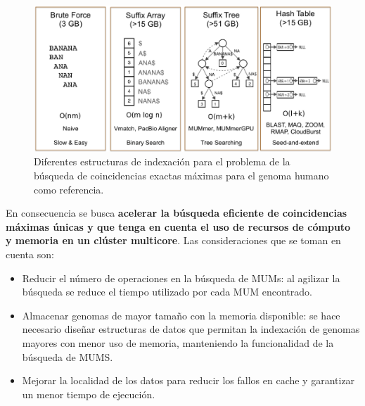 \documentclass[12pt,a4paper]{article}
\begin{document}
\begin{figure}[h] 
   \centering 
   \includegraphics[scale=0.3]{state.eps} 
   \caption{Diferentes estructuras de indexación para el problema de la búsqueda de coincidencias exactas máximas para el genoma humano como referencia.} 
   \label{fig:state} 
 \end{figure}
\indent
En consecuencia se busca \textbf{acelerar la búsqueda eficiente de 
coincidencias máximas únicas y que tenga en cuenta el uso de recursos de cómputo y
memoria en un clúster multicore}. Las consideraciones que se toman en cuenta son:
\begin{itemize}
\item Reducir el número de operaciones en la búsqueda de MUMs: al agilizar la búsqueda se reduce el tiempo utilizado por cada MUM encontrado.
\item Almacenar genomas de mayor tamaño con la memoria disponible: se hace necesario diseñar estructuras de datos que permitan la indexación de genomas mayores con menor uso de memoria, manteniendo la funcionalidad de la búsqueda de MUMS.
\item Mejorar la localidad de los datos para reducir los fallos en cache y garantizar un menor tiempo de ejecución.\end{itemize}
\end{document}
